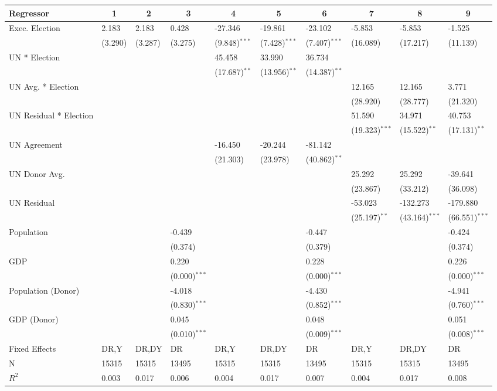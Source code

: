 %
\begin{tabular*}{\textwidth}{@{\extracolsep{\fill}}llllllllll}\hline\hline
\multicolumn{1}{l}{Regressor}&\multicolumn{1}{c}{1}&\multicolumn{1}{c}{2}&\multicolumn{1}{c}{3}&\multicolumn{1}{c}{4}&\multicolumn{1}{c}{5}&\multicolumn{1}{c}{6}&\multicolumn{1}{c}{7}&\multicolumn{1}{c}{8}&\multicolumn{1}{c}{9}\tabularnewline
\hline
Exec. Election&2.183&2.183&0.428&-27.346&-19.861&-23.102&-5.853&-5.853&-1.525\tabularnewline
&{\scriptsize (3.290)$^{}$}&{\scriptsize (3.287)$^{}$}&{\scriptsize (3.275)$^{}$}&{\scriptsize (9.848)$^{***}$}&{\scriptsize (7.428)$^{***}$}&{\scriptsize (7.407)$^{***}$}&{\scriptsize (16.089)$^{}$}&{\scriptsize (17.217)$^{}$}&{\scriptsize (11.139)$^{}$}\tabularnewline
UN * Election&&&&45.458&33.990&36.734&&&\tabularnewline
&&&&{\scriptsize (17.687)$^{**}$}&{\scriptsize (13.956)$^{**}$}&{\scriptsize (14.387)$^{**}$}&&&\tabularnewline
UN Avg. * Election&&&&&&&12.165&12.165&3.771\tabularnewline
&&&&&&&{\scriptsize (28.920)$^{}$}&{\scriptsize (28.777)$^{}$}&{\scriptsize (21.320)$^{}$}\tabularnewline
UN Residual * Election&&&&&&&51.590&34.971&40.753\tabularnewline
&&&&&&&{\scriptsize (19.323)$^{***}$}&{\scriptsize (15.522)$^{**}$}&{\scriptsize (17.131)$^{**}$}\tabularnewline
UN Agreement&&&&-16.450&-20.244&-81.142&&&\tabularnewline
&&&&{\scriptsize (21.303)$^{}$}&{\scriptsize (23.978)$^{}$}&{\scriptsize (40.862)$^{**}$}&&&\tabularnewline
UN Donor Avg.&&&&&&&25.292&25.292&-39.641\tabularnewline
&&&&&&&{\scriptsize (23.867)$^{}$}&{\scriptsize (33.212)$^{}$}&{\scriptsize (36.098)$^{}$}\tabularnewline
UN Residual&&&&&&&-53.023&-132.273&-179.880\tabularnewline
&&&&&&&{\scriptsize (25.197)$^{**}$}&{\scriptsize (43.164)$^{***}$}&{\scriptsize (66.551)$^{***}$}\tabularnewline
Population&&&-0.439&&&-0.447&&&-0.424\tabularnewline
&&&{\scriptsize (0.374)$^{}$}&&&{\scriptsize (0.379)$^{}$}&&&{\scriptsize (0.374)$^{}$}\tabularnewline
GDP&&&0.220&&&0.228&&&0.226\tabularnewline
&&&{\scriptsize (0.000)$^{***}$}&&&{\scriptsize (0.000)$^{***}$}&&&{\scriptsize (0.000)$^{***}$}\tabularnewline
Population (Donor)&&&-4.018&&&-4.430&&&-4.941\tabularnewline
&&&{\scriptsize (0.830)$^{***}$}&&&{\scriptsize (0.852)$^{***}$}&&&{\scriptsize (0.760)$^{***}$}\tabularnewline
GDP (Donor)&&&0.045&&&0.048&&&0.051\tabularnewline
&&&{\scriptsize (0.010)$^{***}$}&&&{\scriptsize (0.009)$^{***}$}&&&{\scriptsize (0.008)$^{***}$}\tabularnewline
Fixed Effects&DR,Y&DR,DY&DR&DR,Y&DR,DY&DR&DR,Y&DR,DY&DR\tabularnewline
N&15315&15315&13495&15315&15315&13495&15315&15315&13495\tabularnewline
$R^2$&0.003&0.017&0.006&0.004&0.017&0.007&0.004&0.017&0.008\tabularnewline
\hline
\end{tabular*}

